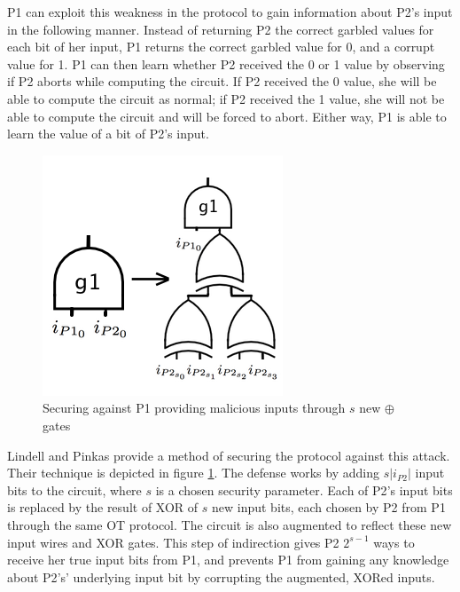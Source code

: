 \ac{P1} can exploit this weakness in the protocol to gain information about \ac{P2}'s input in the following manner.  Instead of returning \ac{P2} the correct garbled values for each bit of her input, \ac{P1} returns the correct garbled value for 0, and a corrupt value for 1.  \ac{P1} can then learn whether \ac{P2} received the 0 or 1 value by observing if \ac{P2} aborts while computing the circuit.  If \ac{P2} received the 0 value, she will be able to compute the circuit as normal; if \ac{P2} received the 1 value, she will not be able to compute the circuit and will be forced to abort.  Either way, \ac{P1} is able to learn the value of a bit of \ac{P2}'s input.

\begin{figure}
    \centering
    \includegraphics[width=\columnwidth]{images/secureing_malicious_inputs}
    \caption{Securing against \ac{P1} providing malicious inputs through $s$ new $\oplus$ gates}
    \label{fig:inputsecure}
\end{figure}

Lindell and Pinkas\cite{lindell2007efficient} provide a method of securing the protocol against this attack.  Their technique is depicted in figure \ref{fig:inputsecure}.  The defense works by adding $s|i_{P2}|$ input bits to the circuit, where $s$ is a chosen security parameter.  Each of \ac{P2}'s input bits is replaced by the result of XOR of $s$ new input bits, each chosen by \ac{P2} from \ac{P1} through the same \ac{OT} protocol.  The circuit is also augmented to reflect these new input wires and XOR gates. This step of indirection gives \ac{P2} $2^{s-1}$ ways to receive her true input bits from \ac{P1}, and prevents \ac{P1} from gaining any knowledge about \ac{P2}'s' underlying input bit by corrupting the augmented, XORed inputs.

